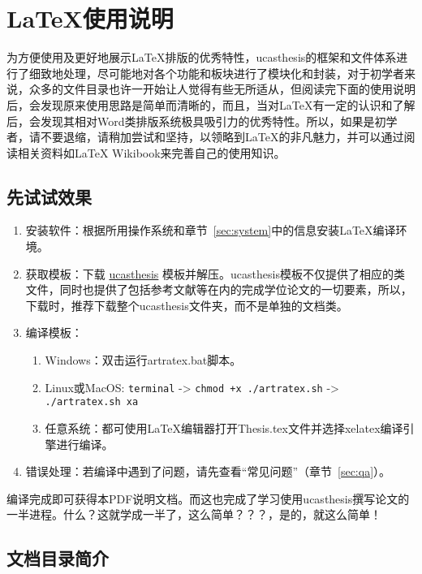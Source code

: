\chapter{\LaTeX{}使用说明}\label{chap:guide}

为方便使用及更好地展示\LaTeX{}排版的优秀特性，ucasthesis的框架和文件体系进行了细致地处理，尽可能地对各个功能和板块进行了模块化和封装，对于初学者来说，众多的文件目录也许一开始让人觉得有些无所适从，但阅读完下面的使用说明后，会发现原来使用思路是简单而清晰的，而且，当对\LaTeX{}有一定的认识和了解后，会发现其相对Word类排版系统极具吸引力的优秀特性。所以，如果是初学者，请不要退缩，请稍加尝试和坚持，以领略到\LaTeX{}的非凡魅力，并可以通过阅读相关资料如\LaTeX{} Wikibook\citep{wikibook2014latex}来完善自己的使用知识。

\section{先试试效果}

\begin{enumerate}
    \item 安装软件：根据所用操作系统和章节~\ref{sec:system}中的信息安装\LaTeX{}编译环境。
    \item 获取模板：下载 \href{https://github.com/mohuangrui/ucasthesis}{ucasthesis} 模板并解压。ucasthesis模板不仅提供了相应的类文件，同时也提供了包括参考文献等在内的完成学位论文的一切要素，所以，下载时，推荐下载整个ucasthesis文件夹，而不是单独的文档类。
    \item 编译模板：
        \begin{enumerate}
            \item Windows：双击运行artratex.bat脚本。
            \item Linux或MacOS: {\scriptsize \verb|terminal| -> \verb|chmod +x ./artratex.sh| -> \verb|./artratex.sh xa|}
            \item 任意系统：都可使用\LaTeX{}编辑器打开Thesis.tex文件并选择xelatex编译引擎进行编译。
        \end{enumerate}
    \item 错误处理：若编译中遇到了问题，请先查看“常见问题”（章节~\ref{sec:qa}）。
\end{enumerate}

编译完成即可获得本PDF说明文档。而这也完成了学习使用ucasthesis撰写论文的一半进程。什么？这就学成一半了，这么简单？？？，是的，就这么简单！

\section{文档目录简介}

